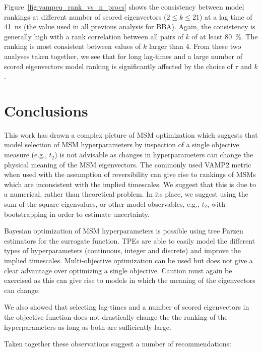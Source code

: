 \documentclass[journal=jacsat,manuscript=article]{achemso}
\begin{document}
Figure~\ref{fig:vampeq_rank_vs_n_procs} shows the consistency between model rankings at different number of scored eigenvectors ($2{\le}k{\le}21$) at a lag time of \SI{41}{\nano\second} (the value used in all previous analysis for BBA). Again, the consistency is generally high with a rank correlation between all pairs of $k$ of at least \SI{80}{\percent}. The ranking is most consistent between values of $k$ larger than \num{4}.  From these two analyses taken together, we see that for long lag-times and a large number of scored eigenvectors model ranking is significantly affected by the choice of $\tau$ and $k$.

\section{Conclusions}

This work has drawn a complex picture of MSM optimization which suggests that model selection of MSM hyperparameters by inspection of a single objective measure (e.g., $t_2$) is not advisable as changes in hyperparameters can change the physical meaning of the MSM eigenvectors.  The commonly used VAMP2 metric when used with the assumption of reversibility can give rise to rankings of MSMs which are inconsistent with the implied timescales. We suggest that this is due to a numerical, rather than theoretical problem. In its place, we suggest using the sum of the square eigenvalues, or other model observables, e.g., $t_2$, with bootstrapping in order to estimate uncertainty.  

Bayesian optimization of MSM hyperparameters is possible using tree Parzen estimators for the surrogate function.  TPEs are able to easily model the different types of hyperparameters (continuous, integer and discrete) and improve the implied timescales. Multi-objective optimization can be used but does not give a clear advantage over optimizing a single objective.  Caution must again be exercised as this can give rise to models in which the meaning of the eigenvectors can change. 

We also showed that selecting lag-times and a number of scored eigenvectors in the objective function does not drastically change the the ranking of the hyperparameters as long as both are sufficiently large.  

Taken together these observations suggest a number of recommendations: 
\end{document}
